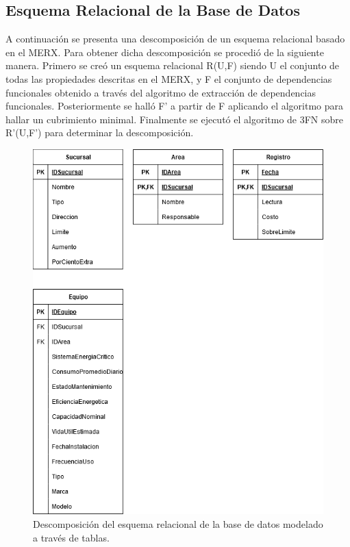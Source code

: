 \documentclass{article}
\begin{document}
\subsection{Esquema Relacional de la Base de Datos}
A continuación se presenta una descomposición de un esquema relacional basado en el MERX. Para obtener dicha descomposición se procedió de la siguiente manera. Primero se creó un esquema relacional R(U,F) siendo U el conjunto de todas las propiedades descritas
en el MERX, y F el conjunto de dependencias funcionales obtenido a través del algoritmo de extracción de dependencias funcionales. Posteriormente se halló F' a partir de F aplicando el algoritmo para hallar un cubrimiento minimal. Finalmente se ejecutó el algoritmo de
3FN sobre R'(U,F') para determinar la descomposición.

\begin{figure}
\includegraphics[scale=0.5]{Imagenes/Informe1/EsquemaRelacional.png}
\caption{Descomposición del esquema relacional de la base de datos modelado a través de tablas.}
\label{esquemaRelacional}
\end{figure}
\end{document}
